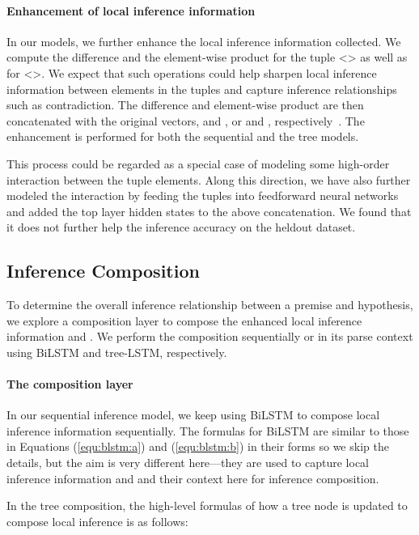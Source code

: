 \documentclass[11pt,a4paper]{article}
\begin{document}
\paragraph{Enhancement of local inference information}
In our models, we further enhance the local inference information collected. We compute the difference and the element-wise product for the tuple <> as well as for <>. We expect that such operations could help sharpen local inference information between elements in the tuples and capture inference relationships such as contradiction. The difference and element-wise product are then concatenated with the original vectors,  and , or  and , respectively~\citep{Mou:P16-2022,Zhang:qa:2017}. The enhancement is performed for both the sequential and the tree models.

{\fontsize{10pt}{1.0cm}
	
}

This process could be regarded as a special case of modeling some high-order interaction between the tuple elements. Along this direction, we have also further modeled the interaction by feeding the tuples into feedforward neural networks and added the top layer hidden states to the above concatenation. We found that it does not further help the inference accuracy on the heldout dataset. 

\subsection{Inference Composition}
To determine the overall inference relationship between a premise and hypothesis, we explore a composition layer to compose the enhanced local inference information  and . We perform the composition sequentially or in its parse context using BiLSTM and tree-LSTM, respectively. 

\paragraph{The composition layer}
\label{sec:composition}

In our sequential inference model, we keep using BiLSTM to compose local inference information sequentially. The formulas for BiLSTM are similar to those in Equations (\ref{equ:blstm:a}) and (\ref{equ:blstm:b}) in their forms so we skip the details, but the aim is very different here---they are used to capture local inference information  and  and their context here for inference composition.  

In the tree composition, the high-level formulas of how a tree node is updated to compose local inference is as follows:  
\end{document}
